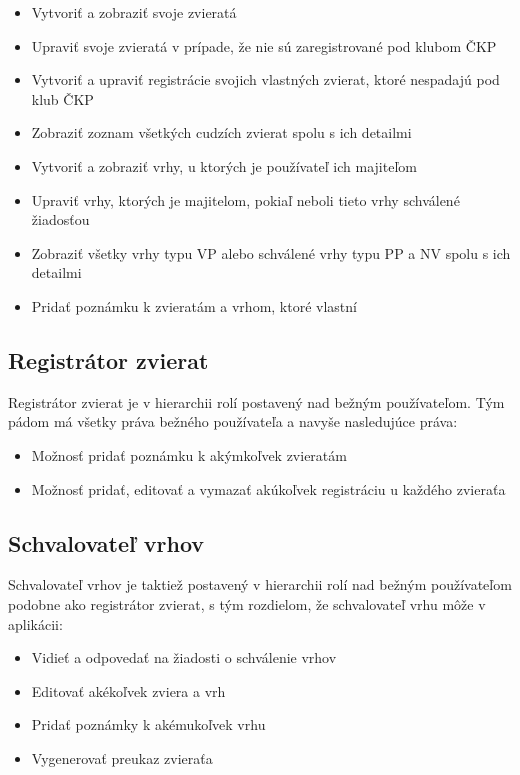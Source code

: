 \begin{itemize}
	\item Vytvoriť a zobraziť svoje zvieratá
	\item Upraviť svoje zvieratá v prípade, že nie sú zaregistrované pod klubom ČKP
	\item Vytvoriť a upraviť registrácie svojich vlastných zvierat, ktoré nespadajú pod klub ČKP
	\item Zobraziť zoznam všetkých cudzích zvierat spolu s ich detailmi
	\item Vytvoriť a zobraziť vrhy, u ktorých je používateľ ich majiteľom
	\item Upraviť vrhy, ktorých je majitelom, pokiaľ neboli tieto vrhy schválené žiadosťou
	\item Zobraziť všetky vrhy typu VP alebo schválené vrhy typu PP a NV spolu s ich detailmi
	\item Pridať poznámku k zvieratám a vrhom, ktoré vlastní
\end{itemize}

\subsection{Registrátor zvierat}\label{registrator-zvierat}
Registrátor zvierat je v hierarchii rolí postavený nad bežným používateľom. Tým pádom má všetky práva bežného používateľa a navyše nasledujúce práva:

\begin{itemize}
	\item Možnosť pridať poznámku k akýmkoľvek zvieratám
	\item Možnosť pridať, editovať a vymazať akúkoľvek registráciu u každého zvieraťa
\end{itemize} 

\subsection{Schvalovateľ vrhov}\label{schvalovatel-vrhov}
Schvalovateľ vrhov je taktiež postavený v hierarchii rolí nad bežným používateľom podobne ako registrátor zvierat, s tým rozdielom, že schvalovateľ vrhu môže v aplikácii:

\begin{itemize}
	\item Vidieť a odpovedať na žiadosti o schválenie vrhov
	\item Editovať akékoľvek zviera a vrh
	\item Pridať poznámky k akémukoľvek vrhu
	\item Vygenerovať preukaz zvieraťa
\end{itemize}

